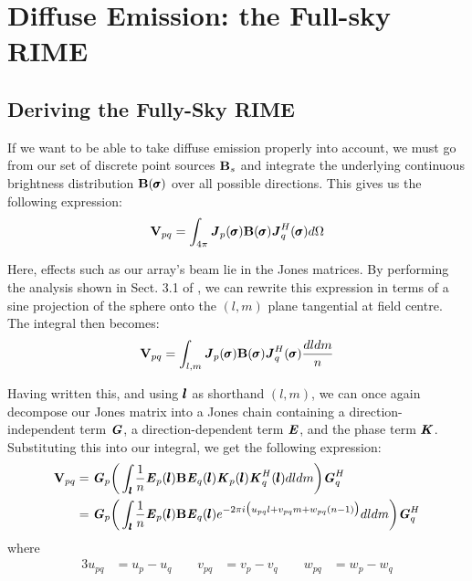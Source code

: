 \section{Diffuse Emission: the Full-sky RIME}
\label{section.RIME.FullSky}

\subsection{Deriving the Fully-Sky RIME}
\label{section.RIME.FullSky.derivation}
\pg
If we want to be able to take diffuse emission properly into account, we must go from our set of discrete point sources $\textbf{B}_s$ and integrate the underlying continuous brightness distribution $\textbf{B}(\pmb{\sigma})$ over all possible directions. This gives us the following expression:
\begin{equation}
\textbf{V}_{pq} = \int_{4\pi} \textbf{\emph{J}}_p(\pmb{\sigma}) \textbf{B}(\pmb{\sigma}) \textbf{\emph{J}}_q^H(\pmb{\sigma})d\Omega
\end{equation}

\pg
Here, effects such as our array's beam lie in the Jones matrices. By performing the analysis shown in Sect. 3.1 of , we can rewrite this expression in terms of a sine projection of the sphere onto the $(l,m)$ plane tangential at field centre. The integral then becomes:
\begin{equation}
\textbf{V}_{pq} = \int_{l,m} \textbf{\emph{J}}_p(\pmb{\sigma}) \textbf{B}(\pmb{\sigma}) \textbf{\emph{J}}_q^H(\pmb{\sigma})\frac{dl dm}{n}
\end{equation}

\pg
Having written this, and using $\pmb{l}$ as shorthand $(l,m)$, we can once again decompose our Jones matrix into a Jones chain containing a direction-independent term $\textbf{\emph{G}}$, a direction-dependent term $\textbf{\emph{E}}$, and the phase term $\textbf{\emph{K}}$. Substituting this into our integral, we get the following expression:
\begin{align}
\textbf{V}_{pq} &= \textbf{\emph{G}}_p \bigg(\int_{\pmb{l}} \frac{1}{n} \textbf{\emph{E}}_p(\pmb{l}) \textbf{B} \textbf{\emph{E}}_q(\pmb{l}) \textbf{\emph{K}}_p(\pmb{l})\textbf{\emph{K}}_q^H(\pmb{l}) dl dm \bigg) \textbf{\emph{G}}_q^H\\
          &= \textbf{\emph{G}}_p \bigg(\int_{\pmb{l}} \frac{1}{n} \textbf{\emph{E}}_p(\pmb{l}) \textbf{B} \textbf{\emph{E}}_q(\pmb{l}) e^{-2\pi i\big(u_{pq}l+v_{pq}m+w_{pq}(n-1)\big)} dl dm \bigg) \textbf{\emph{G}}_q^H
\end{align}
where
\begin{alignat}{3}
u_{pq}&=u_p-u_q \qquad v_{pq}&=v_p-v_q \qquad w_{pq}&=w_p-w_q
\end{alignat}


